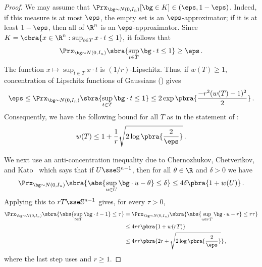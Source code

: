 \documentclass[11pt]{article}
\renewcommand{\S}{\mathbb{S}}
\begin{document}
\begin{proof}
	We may assume that $\Prx_{\bg\sim N(0,I_n)}[\bg\in K]\in(\eps,1-\eps)$.  
	Indeed, if this measure is at most $\eps$, the empty set is an $\eps$-approximator; if it is at least $1-\eps$, then all of $\R^n$ is an $\eps$-approximator. 
	Since
	$K=
		\cbra{
			x\in\R^n:
			\sup_{t\in T}x\cdot t\leq 1
		},
	$ 
	it follows that 
	\[
		\Prx_{\bg\sim N(0,I_n)}
		\sbra{
			\sup_{t\in T}\bg\cdot t\leq 1
		}
		\geq
		\eps\,.
	\]
	The function $x\mapsto \sup_{t\in T}x\cdot t$ is $(1/r)$-Lipschitz. 
	Thus, if $w(T)\geq1$, concentration of Lipschitz functions of Gaussians () gives 
	\[
		\eps
		\leq
		\Prx_{\bg\sim N(0,I_n)}
		\sbra{
			\sup_{t\in T}\bg\cdot t\leq 1
		}
		\leq
		2\exp\pbra{
			\frac{-r^2(w(T)-1)^2}{2}
		}\,.
	\]
	Consequently, we have the following bound for all $T$ as in the statement of : 
	\begin{equation}
		\label{eq:polytope-width-bound}
		w(T)
		\leq
		1+\frac{1}{r}\sqrt{2\log\pbra{\frac{2}{\eps}}}\,.
	\end{equation}

	We next use an anti-concentration inequality due to Chernozhukov, Chetverikov, and Kato~\cite{CCK-2} which says that if $U\sse\S^{n-1}$, then for all $\theta\in\R$ and $\delta>0$ we have 
	\[
		\Prx_{\bg\sim N(0,I_n)}
		\sbra{
			\abs{
				\sup_{u\in U}\bg\cdot u-\theta
			}
			\leq
			\delta
		}
		\leq
		4\delta\pbra{1+w(U)}\,.
	\]
	Applying this to $rT\sse\S^{n-1}$ gives, for every $\tau>0$,
	\begin{align}
		\Prx_{\bg\sim N(0,I_n)}
		\sbra{
			\abs{
				\sup_{t\in T}\bg\cdot t-1
			}
			\leq
			\tau
		}
		&=
		\Prx_{\bg\sim N(0,I_n)}
		\sbra{
			\abs{
				\sup_{u\in rT}\bg\cdot u-r
			}
			\leq
			r\tau
		} \nonumber \\
		&\leq
		4r\tau\pbra{1+w(rT)} \nonumber \\
		&\leq
		4r\tau\pbra{2r+\sqrt{2\log\pbra{\frac{2}{\eps}}}}\,,
		\label{eq:polytope-anti-conc}
	\end{align}
	where the last step uses  and $r\geq1$.


\end{proof}
\end{document}
